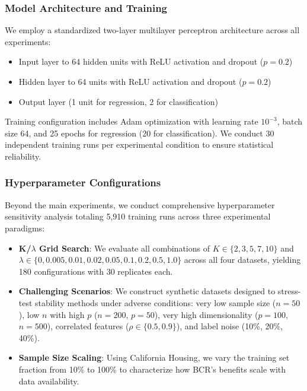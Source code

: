 \documentclass[12pt, letterpaper]{article}
\begin{document}
\subsubsection{Model Architecture and Training}

We employ a standardized two-layer multilayer perceptron architecture across all experiments:
\begin{itemize}
\item Input layer to 64 hidden units with ReLU activation and dropout ($p=0.2$)
\item Hidden layer to 64 units with ReLU activation and dropout ($p=0.2$)
\item Output layer (1 unit for regression, 2 for classification)
\end{itemize}

Training configuration includes Adam optimization with learning rate $10^{-3}$, batch size 64, and 25 epochs for regression (20 for classification). We conduct 30 independent training runs per experimental condition to ensure statistical reliability.

\subsubsection{Hyperparameter Configurations}

Beyond the main experiments, we conduct comprehensive hyperparameter sensitivity analysis totaling 5,910 training runs across three experimental paradigms:

\begin{itemize}
\item \textbf{K/$\lambda$ Grid Search}: We evaluate all combinations of $K \in \{2, 3, 5, 7, 10\}$ and $\lambda \in \{0, 0.005, 0.01, 0.02, 0.05, 0.1, 0.2, 0.5, 1.0\}$ across all four datasets, yielding 180 configurations with 30 replicates each.

\item \textbf{Challenging Scenarios}: We construct synthetic datasets designed to stress-test stability methods under adverse conditions: very low sample size ($n=50$), low $n$ with high $p$ ($n=200$, $p=50$), very high dimensionality ($p=100$, $n=500$), correlated features ($\rho \in \{0.5, 0.9\}$), and label noise (10\%, 20\%, 40\%).

\item \textbf{Sample Size Scaling}: Using California Housing, we vary the training set fraction from 10\% to 100\% to characterize how BCR's benefits scale with data availability.
\end{itemize}
\end{document}
